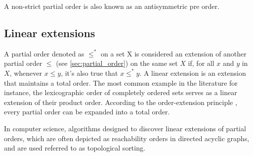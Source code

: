 \documentclass[10pt,journal,compsoc]{IEEEtran}
\begin{document}
A non-strict partial order is also known as an antisymmetric pre order.


\subsection{Linear extensions}
A partial order denoted as $\leq^*$ on a set X is considered an extension of
another partial order $\leq$ (see \ref{sec:partial_order}) on the same set $X$
if, for all $x$ and $y$ in $X$, whenever $x \leq y$, it's also true that $x
  \leq^* y$. A linear extension is an extension that maintains a total order. The
most common example in the literature for instance, the lexicographic order of
completely ordered sets serves as a linear extension of their product order.
According to the order-extension principle \cite{Jech1973}, every partial order
can be expanded into a total order.

In computer science, algorithms designed to discover linear extensions of
partial orders, which are often depicted as reachability orders in directed
acyclic graphs, and are used referred to as topological sorting.
\end{document}
